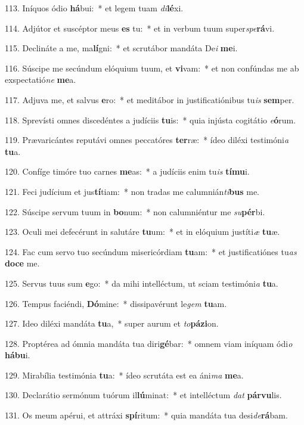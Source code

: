 113. Iníquos ódio \textbf{há}bui:~*  et legem tuam \textit{di}\textbf{lé}xi.\

114. Adjútor et suscéptor meus \textbf{es} tu:~*  et in verbum tuum super\textit{spe}\textbf{rá}vi.\

115. Declináte a me, ma\textbf{lí}gni:~*  et scrutábor mandáta De\textit{i} \textbf{me}i.\

116. Súscipe me secúndum elóquium tuum, et \textbf{vi}vam:~*  et non confúndas me ab exspectatió\textit{ne} \textbf{me}a.\

117. Adjuva me, et salvus \textbf{e}ro:~*  et meditábor in justificatiónibus tu\textit{is} \textbf{sem}per.\

118. Sprevísti omnes discedéntes a judíciis \textbf{tu}is:~*  quia injústa cogitátio \textit{e}\textbf{ó}rum.\

119. Prævaricántes reputávi omnes peccatóres \textbf{ter}ræ:~*  ídeo diléxi testimóni\textit{a} \textbf{tu}a.\

120. Confíge timóre tuo carnes \textbf{me}as:~*  a judíciis enim tu\textit{is} \textbf{tí}\textbf{mu}i.\

121. Feci judícium et jus\textbf{tí}tiam:~*  non tradas me calumnián\textit{ti}\textbf{bus} me.\

122. Súscipe servum tuum in \textbf{bo}num:~*  non calumniéntur me \textit{su}\textbf{pér}bi.\

123. Oculi mei defecérunt in salutáre \textbf{tu}um:~*  et in elóquium justíti\textit{æ} \textbf{tu}æ.\

124. Fac cum servo tuo secúndum misericórdiam \textbf{tu}am:~*  et justificatiónes tu\textit{as} \textbf{do}\textbf{ce} me.\

125. Servus tuus sum \textbf{e}go:~*  da mihi intelléctum, ut sciam testimóni\textit{a} \textbf{tu}a.\

126. Tempus faciéndi, \textbf{Dó}mine:~*  dissipavérunt le\textit{gem} \textbf{tu}am.\

127. Ideo diléxi mandáta \textbf{tu}a,~*  super aurum et \textit{to}\textbf{pá}\textbf{zi}on.\

128. Proptérea ad ómnia mandáta tua diri\textbf{gé}bar:~*  omnem viam iníquam ódi\textit{o} \textbf{há}\textbf{bu}i.\

129. Mirabília testimónia \textbf{tu}a:~*  ídeo scrutáta est ea áni\textit{ma} \textbf{me}a.\

130. Declarátio sermónum tuórum il\textbf{lú}minat:~*  et intelléctum \textit{dat} \textbf{pár}\textbf{vu}lis.\

131. Os meum apérui, et attráxi \textbf{spí}ritum:~*  quia mandáta tua desi\textit{de}\textbf{rá}bam.\

